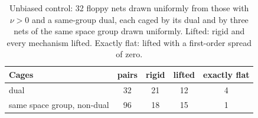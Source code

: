 \begin{table}[h]\centering
\caption{Unbiased control: 32 floppy nets drawn uniformly from those with $\nu>0$ and a same-group dual, each caged by its dual and by three nets of the same space group drawn uniformly. Lifted: rigid and every mechanism lifted. Exactly flat: lifted with a first-order spread of zero.}\label{tab:h5}
\begin{tabular}{lcccc}
\hline
Cages & pairs & rigid & lifted & exactly flat \\
\hline
dual & 32 & 21 & 12 & 4 \\
same space group, non-dual & 96 & 18 & 15 & 1 \\
\hline
\end{tabular}
\end{table}